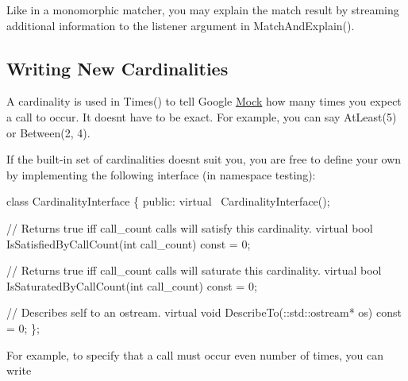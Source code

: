 Like in a monomorphic matcher, you may explain the match result by streaming additional information to the {\ttfamily listener} argument in {\ttfamily Match\+And\+Explain()}.

\subsection*{Writing New Cardinalities}

A cardinality is used in {\ttfamily Times()} to tell Google \hyperlink{classMock}{Mock} how many times you expect a call to occur. It doesn\textquotesingle{}t have to be exact. For example, you can say {\ttfamily At\+Least(5)} or {\ttfamily Between(2, 4)}.

If the built-\/in set of cardinalities doesn\textquotesingle{}t suit you, you are free to define your own by implementing the following interface (in namespace {\ttfamily testing})\+:


\begin{DoxyCode}
\textcolor{keyword}{class }CardinalityInterface \{
 \textcolor{keyword}{public}:
  \textcolor{keyword}{virtual} ~CardinalityInterface();

  \textcolor{comment}{// Returns true iff call\_count calls will satisfy this cardinality.}
  \textcolor{keyword}{virtual} \textcolor{keywordtype}{bool} IsSatisfiedByCallCount(\textcolor{keywordtype}{int} call\_count) \textcolor{keyword}{const} = 0;

  \textcolor{comment}{// Returns true iff call\_count calls will saturate this cardinality.}
  \textcolor{keyword}{virtual} \textcolor{keywordtype}{bool} IsSaturatedByCallCount(\textcolor{keywordtype}{int} call\_count) \textcolor{keyword}{const} = 0;

  \textcolor{comment}{// Describes self to an ostream.}
  \textcolor{keyword}{virtual} \textcolor{keywordtype}{void} DescribeTo(::std::ostream* os) \textcolor{keyword}{const} = 0;
\};
\end{DoxyCode}


For example, to specify that a call must occur even number of times, you can write



